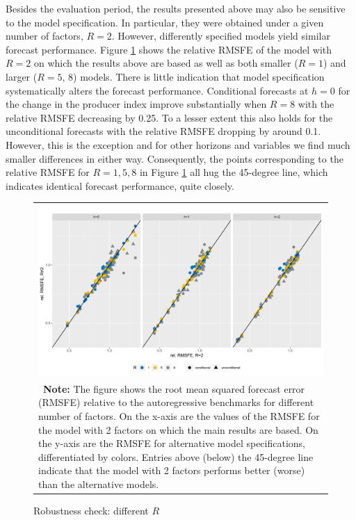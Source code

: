 \documentclass[notitlepage,a4paper,12pt]{article}
\begin{document}
Besides the evaluation period, the results presented above may also be sensitive to the model specification. In particular, they were obtained under a given number of factors, $R=2$. However, differently specified models yield similar forecast performance. Figure \ref{fig:differentR} shows the relative RMSFE of the model with $R=2$ on which the results above are based as well as both smaller ($R=1$) and larger ($R = {5,\,8}$) models. There is little indication that model specification systematically alters the forecast performance. Conditional forecasts at $h=0$ for the change in the producer index improve substantially when $R=8$ with the relative RMSFE decreasing by 0.25. To a lesser extent this also holds for the unconditional forecasts with the relative RMSFE dropping by around 0.1. However, this is the exception and for other horizons and variables we find much smaller differences in either way. Consequently, the points corresponding to the relative RMSFE for $R={1, 5, 8}$ in Figure \ref{fig:differentR} all hug the 45-degree line, which indicates identical forecast performance, quite closely. 

\begin{figure}[htbp] \centering
    \caption{Robustness check: different $R$ \label{fig:differentR}}
    \footnotesize
    \begin{tabular}{p{16cm}}
        \multicolumn{1}{c}{\includegraphics*[scale = 0.6]{../figures/fig_eval_robustness_Nr.pdf}} \\
        {
        \footnotesize \textbf{Note:} The figure shows the root mean squared forecast error (RMSFE) relative to the autoregressive benchmarks for different number of factors. On the x-axis are the values of the RMSFE for the model with 2 factors on which the main results are based. On the y-axis are the RMSFE for alternative model specifications, differentiated by colors. Entries above (below) the 45-degree line indicate that the model with 2 factors performs better (worse) than the alternative models.  
        }
        \end{tabular}
    \newline
    \normalsize
\end{figure}
\end{document}
